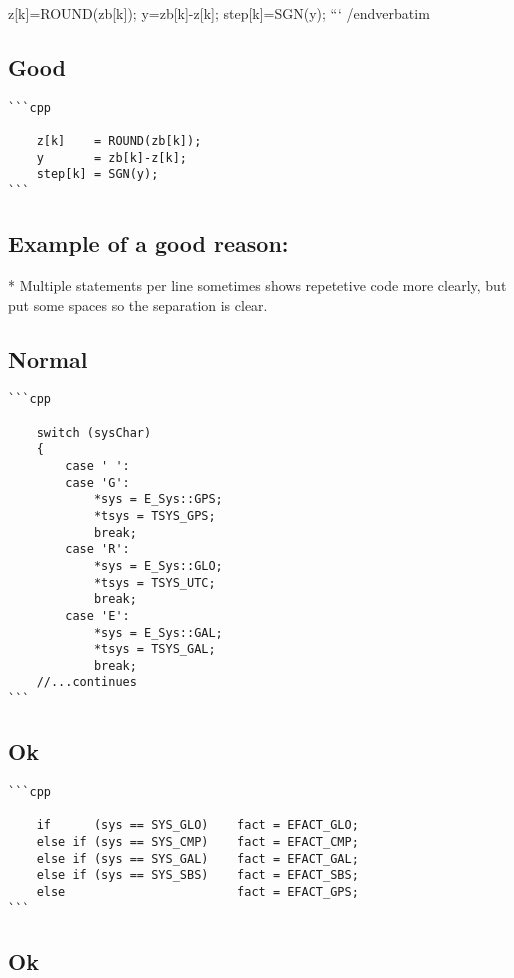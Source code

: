     z[k]=ROUND(zb[k]); y=zb[k]-z[k]; step[k]=SGN(y);
```
/end{verbatim}

\subsection{Good}

\begin{verbatim}
```cpp

    z[k]    = ROUND(zb[k]);
    y       = zb[k]-z[k]; 
    step[k] = SGN(y);
```
\end{verbatim}

\subsection{Example of a good reason:}

* Multiple statements per line sometimes shows repetetive code more clearly, but put some spaces so the separation is clear.

\subsection{Normal}

\begin{verbatim}
```cpp

    switch (sysChar)
    {
        case ' ':
        case 'G': 
            *sys = E_Sys::GPS; 
            *tsys = TSYS_GPS; 
            break;
        case 'R': 
            *sys = E_Sys::GLO;  
            *tsys = TSYS_UTC; 
            break;
        case 'E': 
            *sys = E_Sys::GAL;  
            *tsys = TSYS_GAL; 
            break;
    //...continues
```
\end{verbatim}

\subsection{Ok}

\begin{verbatim}
```cpp

    if      (sys == SYS_GLO)    fact = EFACT_GLO;
	else if (sys == SYS_CMP)    fact = EFACT_CMP;
	else if (sys == SYS_GAL)    fact = EFACT_GAL;
	else if (sys == SYS_SBS)    fact = EFACT_SBS;
	else                        fact = EFACT_GPS;
```
\end{verbatim}

\subsection{Ok}	

